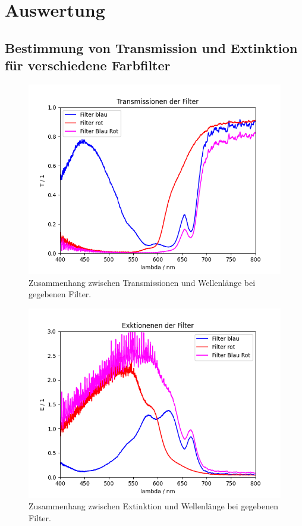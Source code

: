 \documentclass{article}
\begin{document}
\section{Auswertung}

\subsection{Bestimmung von Transmission und Extinktion für verschiedene Farbfilter}


\begin{figure}[H]
\centering
\caption{Zusammenhang zwischen Transmissionen und Wellenlänge bei gegebenen Filter.}
\label{fig:T_Farben}
\includegraphics[scale=0.7]{Transmissionen.png}
\end{figure}



\begin{figure}[H]
\centering
\caption{Zusammenhang zwischen Extinktion und Wellenlänge bei gegebenen Filter.}
\label{fig:Ext}
\includegraphics[scale=0.7]{Extinktionen.png}
\end{figure}
\end{document}
